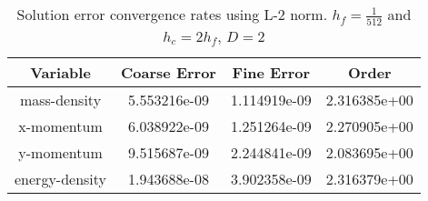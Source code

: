 \begin{table}[p]
\begin{center}
\begin{tabular}{|c|c|c|c|} \hline
Variable & Coarse Error & Fine Error & Order\\
\hline \hline 
mass-density &    	 5.553216e-09 & 1.114919e-09 & 2.316385e+00 \\ 
\hline
x-momentum &    	 6.038922e-09 & 1.251264e-09 & 2.270905e+00 \\ 
\hline
y-momentum &    	 9.515687e-09 & 2.244841e-09 & 2.083695e+00 \\ 
\hline
energy-density &    	 1.943688e-08 & 3.902358e-09 & 2.316379e+00 \\ 
\hline
\end{tabular}
\end{center}
\caption{Solution error convergence rates using L-2 norm. 
$h_f = \frac{1}{512}$ and $h_c = 2 h_f$, $D = 2$ }
\end{table}
